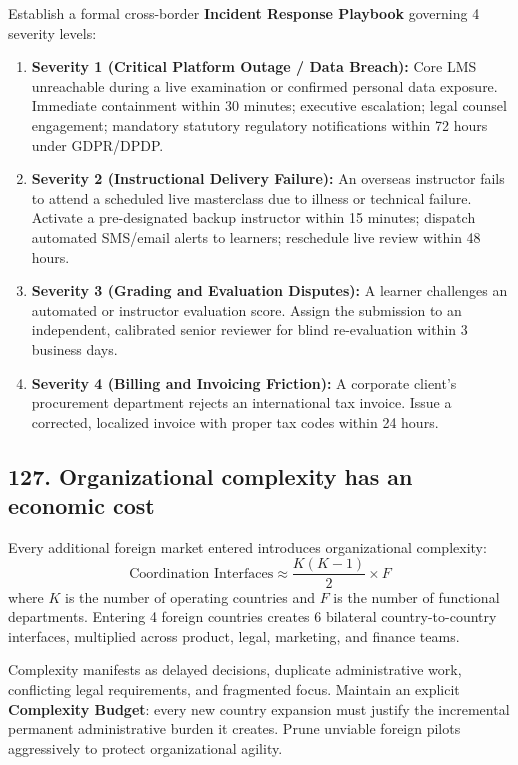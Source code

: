 Establish a formal cross-border \textbf{Incident Response Playbook} governing 4 severity levels:
\begin{enumerate}
    \item \textbf{Severity 1 (Critical Platform Outage / Data Breach):} Core LMS unreachable during a live examination or confirmed personal data exposure. Immediate containment within 30 minutes; executive escalation; legal counsel engagement; mandatory statutory regulatory notifications within 72 hours under GDPR/DPDP.
    \item \textbf{Severity 2 (Instructional Delivery Failure):} An overseas instructor fails to attend a scheduled live masterclass due to illness or technical failure. Activate a pre-designated backup instructor within 15 minutes; dispatch automated SMS/email alerts to learners; reschedule live review within 48 hours.
    \item \textbf{Severity 3 (Grading and Evaluation Disputes):} A learner challenges an automated or instructor evaluation score. Assign the submission to an independent, calibrated senior reviewer for blind re-evaluation within 3 business days.
    \item \textbf{Severity 4 (Billing and Invoicing Friction):} A corporate client's procurement department rejects an international tax invoice. Issue a corrected, localized invoice with proper tax codes within 24 hours.
\end{enumerate}

\subsection{127. Organizational complexity has an economic cost}

Every additional foreign market entered introduces organizational complexity:
\begin{equation}
\text{Coordination Interfaces} \approx \frac{K(K-1)}{2} \times F
\end{equation}
where $K$ is the number of operating countries and $F$ is the number of functional departments. Entering 4 foreign countries creates 6 bilateral country-to-country interfaces, multiplied across product, legal, marketing, and finance teams.

Complexity manifests as delayed decisions, duplicate administrative work, conflicting legal requirements, and fragmented focus. Maintain an explicit \textbf{Complexity Budget}: every new country expansion must justify the incremental permanent administrative burden it creates. Prune unviable foreign pilots aggressively to protect organizational agility.

